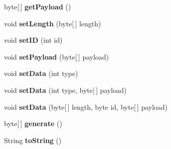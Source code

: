 \begin{DoxyCompactItemize}
\item 
\hypertarget{classj_bittorrent_a_p_i_1_1_message___p_p_ac33f2d150875b6f9f73aaf23f0024ea5}{
byte\mbox{[}$\,$\mbox{]} {\bfseries getPayload} ()}
\label{classj_bittorrent_a_p_i_1_1_message___p_p_ac33f2d150875b6f9f73aaf23f0024ea5}

\item 
\hypertarget{classj_bittorrent_a_p_i_1_1_message___p_p_af1db56323e961c21e83ba909fea4318c}{
void {\bfseries setLength} (byte\mbox{[}$\,$\mbox{]} length)}
\label{classj_bittorrent_a_p_i_1_1_message___p_p_af1db56323e961c21e83ba909fea4318c}

\item 
\hypertarget{classj_bittorrent_a_p_i_1_1_message___p_p_a5fce89c641a72703ef25fca4661df768}{
void {\bfseries setID} (int id)}
\label{classj_bittorrent_a_p_i_1_1_message___p_p_a5fce89c641a72703ef25fca4661df768}

\item 
\hypertarget{classj_bittorrent_a_p_i_1_1_message___p_p_a41d1fe93edc42ee63205c3e82f9018bb}{
void {\bfseries setPayload} (byte\mbox{[}$\,$\mbox{]} payload)}
\label{classj_bittorrent_a_p_i_1_1_message___p_p_a41d1fe93edc42ee63205c3e82f9018bb}

\item 
\hypertarget{classj_bittorrent_a_p_i_1_1_message___p_p_a0a0dbdcd8099306e0f461bf129918e2f}{
void {\bfseries setData} (int type)}
\label{classj_bittorrent_a_p_i_1_1_message___p_p_a0a0dbdcd8099306e0f461bf129918e2f}

\item 
\hypertarget{classj_bittorrent_a_p_i_1_1_message___p_p_a0f8e37faafe8a74285b0f99549aba2b2}{
void {\bfseries setData} (int type, byte\mbox{[}$\,$\mbox{]} payload)}
\label{classj_bittorrent_a_p_i_1_1_message___p_p_a0f8e37faafe8a74285b0f99549aba2b2}

\item 
\hypertarget{classj_bittorrent_a_p_i_1_1_message___p_p_aee02a34f93c49381bdb40950595eb17e}{
void {\bfseries setData} (byte\mbox{[}$\,$\mbox{]} length, byte id, byte\mbox{[}$\,$\mbox{]} payload)}
\label{classj_bittorrent_a_p_i_1_1_message___p_p_aee02a34f93c49381bdb40950595eb17e}

\item 
\hypertarget{classj_bittorrent_a_p_i_1_1_message___p_p_aa68968cb3c8747bd4a68f91fc8d2517a}{
byte\mbox{[}$\,$\mbox{]} {\bfseries generate} ()}
\label{classj_bittorrent_a_p_i_1_1_message___p_p_aa68968cb3c8747bd4a68f91fc8d2517a}

\item 
\hypertarget{classj_bittorrent_a_p_i_1_1_message___p_p_a6001cf32573beacfa6c272629ed634c9}{
String {\bfseries toString} ()}
\label{classj_bittorrent_a_p_i_1_1_message___p_p_a6001cf32573beacfa6c272629ed634c9}

\end{DoxyCompactItemize}


